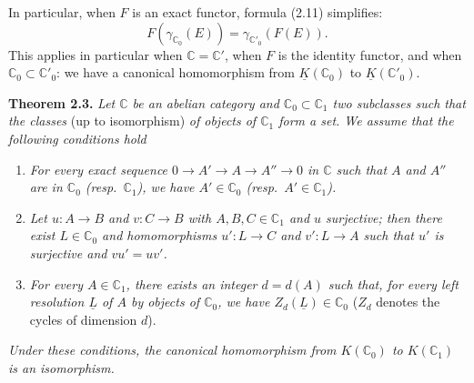 In particular, when $F$ is an exact functor, formula (2.11) simplifies:
\begin{equation}\tag{2.11 bis}
 F(\gamma_{\mathbb{C}_0}(E))=\gamma_{\mathbb{C}'_0}(F(E)).
\end{equation}
This applies in particular when $\mathbb{C}=\mathbb{C}'$, when $F$ is the identity functor, and when $\mathbb{C}_0\subset\mathbb{C}'_0$: we have a canonical homomorphism from $\underline{K}(\mathbb{C}_0)$ to $\underline{K}(\mathbb{C}'_0)$.

\textbf{Theorem 2.3.} \emph{Let $\mathbb{C}$ be an abelian category and $\mathbb{C}_0\subset\mathbb{C}_1$ two subclasses such that the classes} (up to isomorphism) \emph{of objects of $\mathbb{C}_1$ form a set. We assume that the following conditions hold}
\begin{enumerate}[label=(\roman*)]
\item \emph{For every exact sequence $0\to A'\to A\to A''\to0$ in $\mathbb{C}$ such that $A$ and $A''$ are in $\mathbb{C}_0$ (resp.\ $\mathbb{C}_1$), we have $A'\in\mathbb{C}_0$ (resp.\ $A'\in\mathbb{C}_1$).}
\item \emph{Let $u:A\to B$ and $v:C\to B$ with $A,B,C\in\mathbb{C}_1$ and $u$ surjective; then there exist $L\in\mathbb{C}_0$ and homomorphisms $u':L\to C$ and $v':L\to A$ such that $u'$ is surjective and $vu'=uv'$.}
\item \emph{For every $A\in\mathbb{C}_1$, there exists an integer $d=d(A)$ such that, for every left resolution $\underline{L}$ of $A$ by objects of $\mathbb{C}_0$, we have $Z_d(\underline{L})\in\mathbb{C}_0$} ($Z_d$ denotes the cycles of dimension $d$).
\end{enumerate}
\emph{Under these conditions, the canonical homomorphism from $K(\mathbb{C}_0)$ to $K(\mathbb{C}_1)$ is an isomorphism.}

